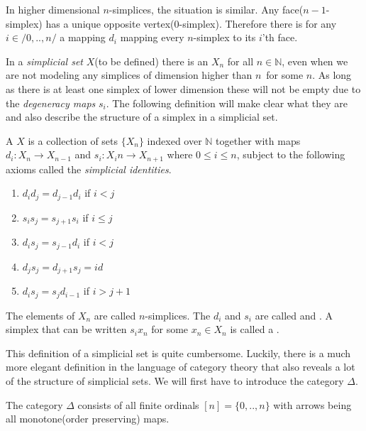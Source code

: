 \documentclass[../../main.tex]{subfiles}
\begin{document}
    In higher dimensional $n$-simplices, the situation is similar. Any face($n-1$-simplex) has a unique opposite vertex($0$-simplex). Therefore there is for any $i \in /{0,..,n/}$ a mapping $d_i$ mapping every $n$-simplex to its $i$'th face.

    In a \emph{simplicial set} $X$(to be defined) there is an $X_n$ for all $n \in \mathbb{N}$, even when we are not modeling any simplices of dimension higher than $n$ for some $n$. As long as there is at least one simplex of lower dimension these will not be empty due to the \emph{degeneracy maps} $s_i$. The following definition will make clear what they are and also describe the structure of a simplex in a simplicial set.

    \begin{definition}\label{simplicial-set}
        A  $X$ is a collection of sets $\{X_n\}$ indexed over $\mathbb{N}$ together with maps $d_i: X_n \to X_{n-1}$ and $s_i: X_in\to X_{n+1}$ where $0 \leq i \leq n$, subject to the following axioms called the \emph{simplicial identities}.
        
        \begin{enumerate}
            \item $d_id_j = d_{j-1}d_i$ if $i < j$
            \item $s_is_j = s_{j+1}s_i$ if $i \leq j$
            \item $d_is_j = s_{j-1}d_i$ if $i < j$
            \item $d_js_j = d_{j+1}s_j = id$
            \item $d_is_j = s_jd_{i-1}$ if $i > j+1$
        \end{enumerate}
    \end{definition}

    The elements of $X_n$ are called $n$-simplices. The $d_i$ and $s_i$ are called  and . A simplex that can be written $s_ix_n$ for some $x_n \in X_n$ is called a .
    
    This definition of a simplicial set is quite cumbersome. Luckily, there is a much more elegant definition in the language of category theory that also reveals a lot of the structure of simplicial sets. We will first have to introduce the category $\Delta$.

    \begin{definition}
        The category $\Delta$ consists of all finite ordinals $[n] = \{0, .., n\}$ with arrows being all monotone(order preserving) maps.
    \end{definition}
\end{document}

